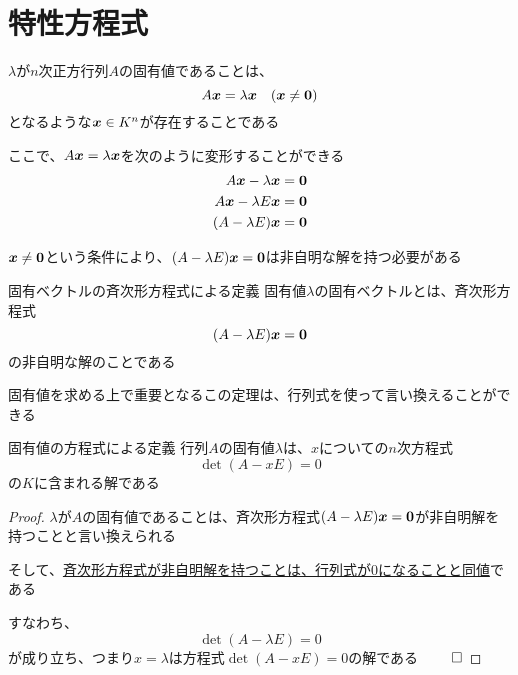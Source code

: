 \documentclass[../../../topic_linear-algebra]{subfiles}
\begin{document}
\sectionline
\section{特性方程式}

$\lambda$が$n$次正方行列$A$の固有値であることは、
\begin{equation*}
  A\vb*{x} = \lambda \vb*{x} \quad (\vb*{x} \neq \vb*{0})
\end{equation*}
となるような$\vb*{x} \in K^n$が存在することである

\br

ここで、$A\vb*{x} = \lambda \vb*{x}$を次のように変形することができる
\begin{align*}
  A\vb*{x} - \lambda \vb*{x}  & = \vb*{0} \\
  A\vb*{x} - \lambda E\vb*{x} & = \vb*{0} \\
  (A - \lambda E)\vb*{x}      & = \vb*{0}
\end{align*}

$\vb*{x} \neq \vb*{0}$という条件により、$(A - \lambda E)\vb*{x} = \vb*{0}$は非自明な解を持つ必要がある

\begin{theorem}{固有ベクトルの斉次形方程式による定義}
  固有値$\lambda$の固有ベクトルとは、斉次形方程式
  \begin{equation*}
    (A - \lambda E)\vb*{x} = \vb*{0}
  \end{equation*}
  の非自明な解のことである
\end{theorem}

固有値を求める上で重要となるこの定理は、行列式を使って言い換えることができる

\begin{theorem}{固有値の方程式による定義}
  行列$A$の固有値$\lambda$は、$x$についての$n$次方程式
  \begin{equation*}
    \det(A - x E) = 0
  \end{equation*}
  の$K$に含まれる解である
\end{theorem}

\begin{proof}
  $\lambda$が$A$の固有値であることは、斉次形方程式$(A - \lambda E)\vb*{x} = \vb*{0}$が非自明解を持つことと言い換えられる

  そして、\hyperref[thm:homogeneous-solution-iff-det-zero]{斉次形方程式が非自明解を持つことは、行列式が0になることと同値}である

  すなわち、
  \begin{equation*}
    \det(A - \lambda E) = 0
  \end{equation*}
  が成り立ち、つまり$x = \lambda$は方程式$\det(A - xE) = 0$の解である $\qed$
\end{proof}
\end{document}
